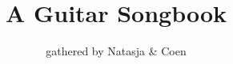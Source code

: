 \documentclass[11pt,a4,openany]{article}
\title{A Guitar Songbook}
\author{gathered by Natasja \& Coen}
\begin{document}

\maketitle




\begin{songs}{} %

	\onecolumn

	
	
	
	
	
	
	
	
	
	
	
	
	
	
	


%			
\end{songs}




\end{document}
